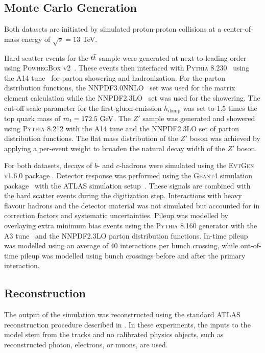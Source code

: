 \subsection{Monte Carlo Generation}

Both datasets are initiated by simulated proton-proton collisions at a center-of-mass energy of $\sqrt{s} = 13$ TeV.

Hard scatter events for the $t\bar{t}$ sample were generated at next-to-leading order using \textsc{PowhegBox v2}~\cite{Powheg1, Powheg2, Powheg3}.
These events then interfaced with \textsc{Pythia 8.230}~\cite{Pythia8} using the \textsc{A14} tune~\cite{A14} for parton showering and hadronization.
For the parton distribution functions, the \textsc{NNPDF3.0NNLO}~\cite{PDF3.0} set was used for the matrix element calculation while the \textsc{NNPDF2.3LO}~\cite{PDF2.3} set was used for the showering.
The cut-off scale parameter for the first-gluon-emission $h_{\text{damp}}$ was set to 1.5 times the top quark mass of $m_t = 172.5~\GeV$.
The $Z'$ sample was generated and showered using \textsc{Pythia 8.212} with the \textsc{A14} tune and the \textsc{NNPDF2.3LO} set of parton distribution functions.
The flat mass distribution of the $Z'$ boson was achieved by applying a per-event weight to broaden the natural decay width of the $Z'$ boson.

For both datasets, decays of $b$- and $c$-hadrons were simulated using the \textsc{EvtGen v1.6.0} package \cite{EvtGen}.
Detector response was performed using the \textsc{Geant4} simulation package~\cite{Geant4} with the ATLAS simulation setup~\cite{ATLASSim}.
These signals are combined with the hard scatter events during the digitization step.
Interactions with heavy flavour hadrons and the detector material was not simulated but accounted for in correction factors and systematic uncertainties.
Pileup was modelled by overlaying extra minimum bias events using the \textsc{Pythia 8.160} generator with the \textsc{A3} tune~\cite{A3} and the \textsc{NNPDF2.3LO} parton distribution functions.
In-time pileup was modelled using an average of 40 interactions per bunch crossing, while out-of-time pileup was modelled using bunch crossings before and after the primary interaction.

\subsection{Reconstruction}

The output of the simulation was reconstructed using the standard ATLAS reconstruction procedure described in .
In these experiments, the inputs to the model stem from the tracks and no calibrated physics objects, such as reconstructed photon, electrons, or muons, are used.

